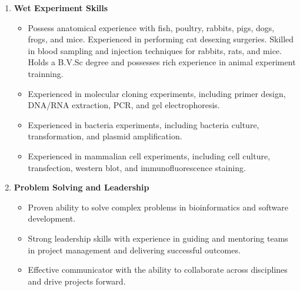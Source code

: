 \begin{enumerate}
    \item \textbf{Wet Experiment Skills}
    \begin{itemize}
        \item Possess anatomical experience with fish, poultry, rabbits, pigs, dogs, frogs, and mice.
        Experienced in performing cat desexing surgeries.
        Skilled in blood sampling and injection techniques for rabbits, rats, and mice.
        Holds a B.V.Sc degree and possesses rich experience in animal experiment trainning.
        \item Experienced in molecular cloning experiments, including primer design, DNA/RNA extraction, PCR, and gel electrophoresis.
        \item Experienced in bacteria experiments, including bacteria culture, transformation, and plasmid amplification.
        \item Experienced in mammalian cell experiments, including cell culture, transfection, western blot, and immunofluorescence staining.
    \end{itemize}
    \item \textbf{Problem Solving and Leadership}
    \begin{itemize}
        \item Proven ability to solve complex problems in bioinformatics and software development.
        \item Strong leadership skills with experience in guiding and mentoring teams in project management and delivering successful outcomes.
        \item Effective communicator with the ability to collaborate across disciplines and drive projects forward.
    \end{itemize}
\end{enumerate}


